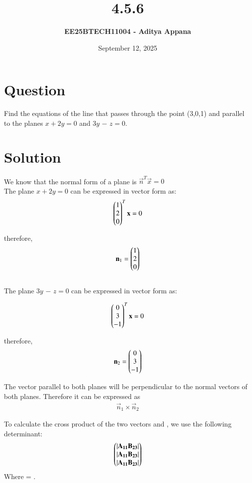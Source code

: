 \documentclass[12pt]{article}
\title{\textbf{4.5.6}}
\author{\textbf{EE25BTECH11004 - Aditya Appana}}
\date{September 12, 2025}
\begin{document}
\maketitle

\section*{Question}
Find the equations of the line that passes through the point (3,0,1) and parallel to the
planes $x + 2y = 0$ and $3y$ $-$ $z = 0$.

\section*{Solution}

We know that the normal form of a plane is $\vec{n}^T\vec{x} = 0$ \\
The plane $x + 2y = 0$ can be expressed in vector form as:
\begin{align}
    \begin{pmatrix}1\\2\\0\end{pmatrix}^T\mathbf{x} = 0
\end{align} 

therefore, \begin{align}\mathbf{n}_1 = \begin{pmatrix}1\\2\\0\end{pmatrix}\end{align} \\
The plane $3y$ $-$ $z=0$ can be expressed in vector form as:

\begin{align}
    \begin{pmatrix}0 \\ 3 \\-1\end{pmatrix}^T\mathbf{x} = 0
\end{align}

therefore, \begin{align}\mathbf{n}_2 = \begin{pmatrix}0\\3\\-1\end{pmatrix} \end{align}

The vector parallel to both planes will be perpendicular to the normal vectors of both planes. Therefore it can be expressed as
\begin{align} \vec{n}_1 \times \vec{n}_2 \end{align}

To calculate the cross product of the two vectors  and , we use the following determinant:
\begin{align}
\begin{pmatrix}|\mathbf{A_{11}} \mathbf{B_{23}}| \\ |\mathbf{A_{11}}   \mathbf{B_{23}}| \\ |\mathbf{A_{11}} \mathbf{B_{23}}| \end{pmatrix}
\end{align}
Where  = . \\
\end{document}
